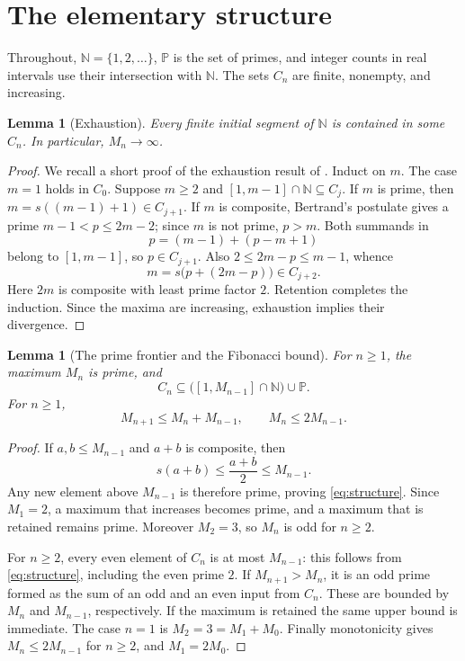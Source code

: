 \documentclass[11pt,letterpaper]{article}
\numberwithin{equation}{section}
\newtheorem{lemma}[theorem]{Lemma}
\theoremstyle{definition}
\theoremstyle{remark}
\newcommand{\N}{\mathbb N}
\newcommand{\Pp}{\mathbb P}
\begin{document}
\section{The elementary structure}
\label{sec:structure}

Throughout, $\N=\{1,2,\ldots\}$, $\Pp$ is the set of primes, and integer
counts in real intervals use their intersection with $\N$.
The sets $C_n$ are finite, nonempty, and increasing.

\begin{lemma}[Exhaustion]\label{lem:exhaustion}
Every finite initial segment of $\N$ is contained in some $C_n$.
In particular, $M_n\to\infty$.
\end{lemma}

\begin{proof}
We recall a short proof of the exhaustion result of \cite{CVZ}.
Induct on $m$. The case $m=1$ holds in $C_0$. Suppose $m\ge2$ and
$[1,m-1]\cap\N\subseteq C_j$.
If $m$ is prime, then $m=s((m-1)+1)\in C_{j+1}$.
If $m$ is composite, Bertrand's postulate gives a prime
$m-1<p\le2m-2$; since $m$ is not prime, $p>m$.
Both summands in
\[
 p=(m-1)+(p-m+1)
\]
belong to $[1,m-1]$, so $p\in C_{j+1}$. Also
$2\le2m-p\le m-1$, whence
\[
 m=s\bigl(p+(2m-p)\bigr)\in C_{j+2}.
\]
Here $2m$ is composite with least prime factor $2$. Retention completes
the induction. Since the maxima are increasing, exhaustion implies their
divergence.
\end{proof}

\begin{lemma}[The prime frontier and the Fibonacci bound]\label{lem:structure}
For $n\ge1$, the maximum $M_n$ is prime, and
\begin{equation}\label{eq:structure}
 C_n\subseteq\bigl([1,M_{n-1}]\cap\N\bigr)\cup\Pp.
\end{equation}
For $n\ge1$,
\begin{equation}\label{eq:fib-upper}
 M_{n+1}\le M_n+M_{n-1},\qquad M_n\le2M_{n-1}.
\end{equation}
\end{lemma}

\begin{proof}
If $a,b\le M_{n-1}$ and $a+b$ is composite, then
\[
 s(a+b)\le\frac{a+b}{2}\le M_{n-1}.
\]
Any new element above $M_{n-1}$ is therefore prime, proving
\eqref{eq:structure}. Since $M_1=2$, a maximum that increases becomes
prime, and a maximum that is retained remains prime. Moreover $M_2=3$,
so $M_n$ is odd for $n\ge2$.

For $n\ge2$, every even element of $C_n$ is at most $M_{n-1}$:
this follows from \eqref{eq:structure}, including the even prime $2$.
If $M_{n+1}>M_n$, it is an odd prime formed as the sum of an odd and
an even input from $C_n$. These are bounded by $M_n$ and $M_{n-1}$,
respectively. If the maximum is retained the same upper bound is immediate.
The case $n=1$ is $M_2=3=M_1+M_0$. Finally monotonicity gives
$M_n\le2M_{n-1}$ for $n\ge2$, and $M_1=2M_0$.
\end{proof}
\end{document}
